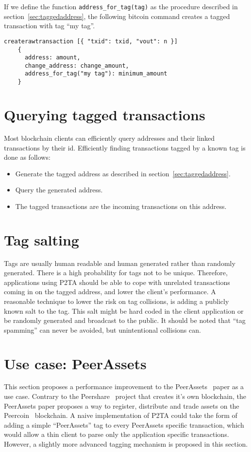 \documentclass[a4paper,10pt]{article}
\begin{document}
If we define the function \verb|address_for_tag(tag)| as the procedure described in section~\ref{sec:taggedaddress}, the following bitcoin command creates a tagged transaction with tag ``my tag''.
\begin{verbatim}
createrawtransaction [{ "txid": txid, "vout": n }]
    {
      address: amount,
      change_address: change_amount,
      address_for_tag("my tag"): minimum_amount
    }
\end{verbatim}


\section{Querying tagged transactions}
Most blockchain clients can efficiently query addresses and their linked transactions by their id.
Efficiently finding transactions tagged by a known tag is done as follows:
\begin{itemize}
 \item Generate the tagged address as described in section~\ref{sec:taggedaddress}.
 \item Query the generated address.
 \item The tagged transactions are the incoming transactions on this address.
\end{itemize}


\section{Tag salting}
Tags are usually human readable and human generated rather than randomly generated.
There is a high probability for tags not to be unique.
Therefore, applications using P2TA should be able to cope with unrelated transactions coming in on the tagged address, and lower the client's performance.
A reasonable technique to lower the risk on tag collisions, is adding a publicly known salt to the tag.
This salt might be hard coded in the client application or be randomly generated and broadcast to the public.
It should be noted that ``tag spamming'' can never be avoided, but unintentional collisions can.


\section{Use case: PeerAssets}
This section proposes a performance improvement to the PeerAssets~\cite{Pchem} paper as a use case.
Contrary to the Peershare~\cite{Lee13} project that creates it's own blockchain, the PeerAssets paper proposes a way to register, distribute and trade assets on the Peercoin~\cite{King12} blockchain.
A naive implementation of P2TA could take the form of adding a simple ``PeerAssets'' tag to every PeerAssets specific transaction, which would allow a thin client to parse only the application specific transactions.
However, a slightly more advanced tagging mechanism is proposed in this section.
\end{document}
